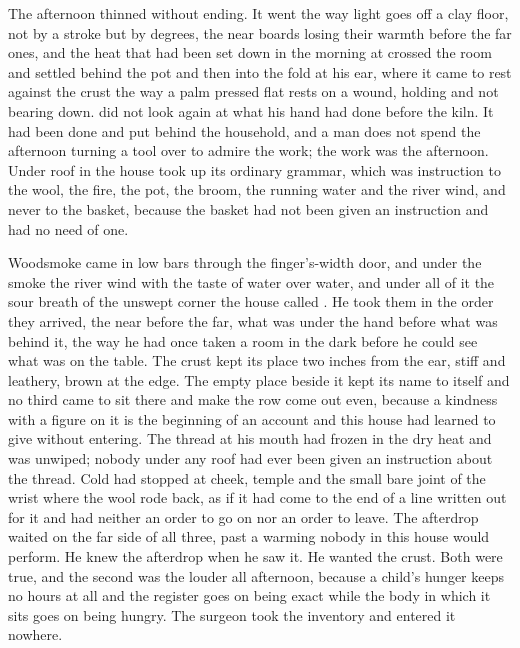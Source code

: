 The afternoon thinned without ending. It went the way light goes off a clay floor, not by a stroke but by degrees, the near boards losing their warmth before the far ones, and the heat that had been set down in the morning at  crossed the room and settled behind the pot and then into the fold at his ear, where it came to rest against the crust the way a palm pressed flat rests on a wound, holding and not bearing down.  did not look again at what his hand had done before the kiln. It had been done and put behind the household, and a man does not spend the afternoon turning a tool over to admire the work; the work was the afternoon. Under  roof in  the house took up its ordinary grammar, which was instruction to the wool, the fire, the pot, the broom, the running water and the river wind, and never to the basket, because the basket had not been given an instruction and had no need of one.

Woodsmoke came in low bars through the finger's-width door, and under the smoke the river wind with the taste of water over water, and under all of it the sour breath of the unswept corner the house called . He took them in the order they arrived, the near before the far, what was under the hand before what was behind it, the way he had once taken a room in the dark before he could see what was on the table. The crust kept its place two inches from the ear, stiff and leathery, brown at the edge. The empty place beside it kept its name to itself and no third came to sit there and make the row come out even, because a kindness with a figure on it is the beginning of an account and this house had learned to give without entering. The thread at his mouth had frozen in the dry heat and was unwiped; nobody under any roof had ever been given an instruction about the thread. Cold had stopped at cheek, temple and the small bare joint of the wrist where the wool rode back, as if it had come to the end of a line written out for it and had neither an order to go on nor an order to leave. The afterdrop waited on the far side of all three, past a warming nobody in this house would perform. He knew the afterdrop when he saw it. He wanted the crust. Both were true, and the second was the louder all afternoon, because a child's hunger keeps no hours at all and the register goes on being exact while the body in which it sits goes on being hungry. The surgeon took the inventory and entered it nowhere.

